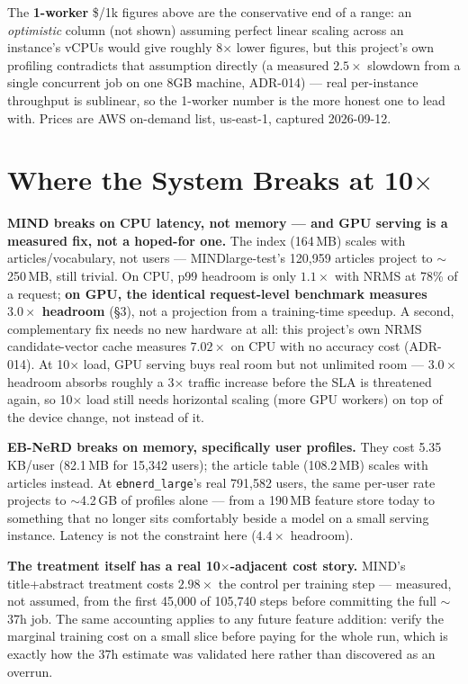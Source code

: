 \documentclass[11pt]{article}
\begin{document}
The \textbf{1-worker} \$/1k figures above are the conservative end of a range:
an \emph{optimistic} column (not shown) assuming perfect linear scaling across
an instance's vCPUs would give roughly 8$\times$ lower figures, but this
project's own profiling contradicts that assumption directly (a measured
$2.5\times$ slowdown from a single concurrent job on one 8GB machine,
ADR-014) --- real per-instance throughput is sublinear, so the 1-worker number
is the more honest one to lead with. Prices are AWS on-demand list, us-east-1,
captured 2026-09-12.

\section{Where the System Breaks at 10$\times$}

\textbf{MIND breaks on CPU latency, not memory --- and GPU serving is a
measured fix, not a hoped-for one.} The index (164\,MB) scales with
articles/vocabulary, not users --- MINDlarge-test's 120,959 articles project to
$\sim$250\,MB, still trivial. On CPU, p99 headroom is only $1.1\times$ with
NRMS at 78\% of a request; \textbf{on GPU, the identical request-level
benchmark measures $3.0\times$ headroom} (\S3), not a projection from a
training-time speedup. A second, complementary fix needs no new hardware at
all: this project's own NRMS candidate-vector cache measures $7.02\times$ on
CPU with no accuracy cost (ADR-014). At 10$\times$ load, GPU serving buys real
room but not unlimited room --- $3.0\times$ headroom absorbs roughly a
3$\times$ traffic increase before the SLA is threatened again, so 10$\times$
load still needs horizontal scaling (more GPU workers) on top of the device
change, not instead of it.

\textbf{EB-NeRD breaks on memory, specifically user profiles.} They cost
5.35\,KB/user (82.1\,MB for 15{,}342 users); the article table (108.2\,MB)
scales with articles instead. At \texttt{ebnerd\_large}'s real 791{,}582 users,
the same per-user rate projects to $\sim$4.2\,GB of profiles alone --- from a
190\,MB feature store today to something that no longer sits comfortably beside
a model on a small serving instance. Latency is not the constraint here
($4.4\times$ headroom).

\textbf{The treatment itself has a real 10$\times$-adjacent cost story.} MIND's
title+abstract treatment costs $2.98\times$ the control per training step ---
measured, not assumed, from the first 45{,}000 of 105{,}740 steps before
committing the full $\sim$37h job. The same accounting applies to any future
feature addition: verify the marginal training cost on a small slice before
paying for the whole run, which is exactly how the 37h estimate was validated
here rather than discovered as an overrun.
\end{document}
